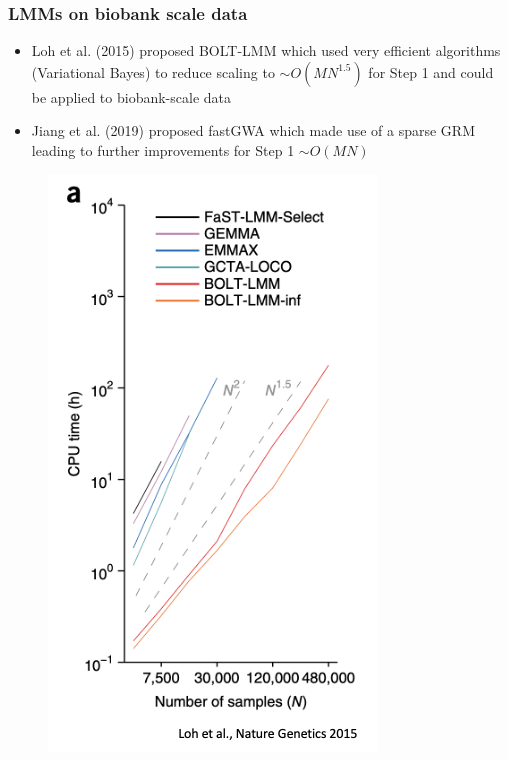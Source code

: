 \documentclass{beamer}
\begin{document}
\begin{frame}
	\frametitle{\bf  LMMs on biobank scale data }
	
	\begin{minipage}{.7\textwidth}
	\begin{itemize}
	\item Loh et al. (2015) proposed BOLT-LMM which used very efficient algorithms  (Variational Bayes) to reduce scaling to $\sim O(MN^{1.5})$ for Step 1 and could be applied to biobank-scale data
	\item Jiang et al. (2019) proposed fastGWA which made use of a sparse GRM leading to further improvements for Step 1 $\sim O(MN)$ 
\end{itemize}
	\end{minipage}%
	\begin{minipage}{.3\textwidth}
	\begin{figure}
	\includegraphics[scale=.4]{Figures/lmm_bolt}
\end{figure}
	\end{minipage}

\end{frame}
\end{document}
